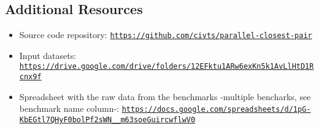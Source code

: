 \subsection{Additional Resources}
\begin{itemize}
      \item Source code repository: \texttt{\url{https://github.com/civts/parallel-closest-pair}}
            \label{link:source}
      \item Input datasets: \texttt{\url{https://drive.google.com/drive/folders/12EFktu1ARw6exKn5k1AvLlHtD1Rcnx9f}}
      \item Spreadsheet with the raw data from the benchmarks -multiple bencharks, see benchmark name column-: \texttt{\url{https://docs.google.com/spreadsheets/d/1pG-KbEGtl7QHyF0bolPf2sWN__m63soeGuircwflwV0}}
            \label{link:spreadsheet}
\end{itemize}